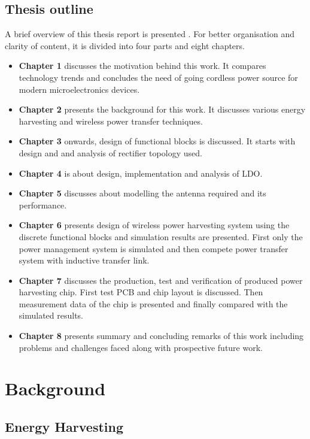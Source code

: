 \documentclass[12pt,a4paper,UKenglish]{report}
\begin{document}
\section{Thesis outline}

A brief overview of this thesis report is presented . For better organisation and clarity of content, it is divided into four parts 
and eight chapters. 
\begin{itemize}
\item \textbf{Chapter 1} discusses the motivation behind this work. It compares technology trends and concludes
the need of going cordless power source for modern microelectronics devices.
\item \textbf{Chapter 2} presents the background for this work. It discusses various energy harvesting and 
wireless power transfer techniques.
\item \textbf{Chapter 3} onwards, design of functional blocks is discussed. It starts with design and 
and analysis of rectifier topology used.
\item \textbf{Chapter 4} is about design, implementation and analysis of LDO.
\item \textbf{Chapter 5} discusses about modelling the antenna required and its performance. 
\item \textbf{Chapter 6} presents design of wireless power harvesting system using the discrete functional blocks and simulation 
results are presented. First only the power management system is simulated and then compete power transfer system with 
inductive transfer link.
\item \textbf{Chapter 7} discusses the production, test and verification of produced power harvesting chip. First test PCB and 
chip layout is discussed. Then measurement data of the chip is presented and finally compared with the simulated results.
\item \textbf{Chapter 8} presents summary and concluding remarks of this work including problems and challenges faced 
along with prospective future work.

\end{itemize}




\chapter{Background}

\section{Energy Harvesting}
\end{document}
